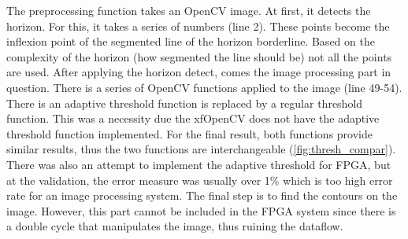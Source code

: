 The preprocessing function takes an OpenCV image.
At first, it detects the horizon.
For this, it takes a series of numbers (line 2).
These points become the inflexion point of the segmented line of the horizon borderline.
Based on the complexity of the horizon (how segmented the line should be) not all the points are used.
After applying the horizon detect, comes the image processing part in question.
There is a series of OpenCV functions applied to the image (line 49-54).
There is an adaptive threshold function is replaced by a regular threshold function.
This was a necessity due the xfOpenCV does not have the adaptive threshold function implemented.
For the final result, both functions provide similar results, thus the two functions are interchangeable (\cref{fig:thresh_compar}).
There was also an attempt to implement the adaptive threshold for FPGA, but at the validation, the error measure was usually over 1\% which is too high error rate for an image processing system.
The final step is to find the contours on the image.
However, this part cannot be included in the FPGA system since there is a double cycle that manipulates the image, thus ruining the dataflow.

